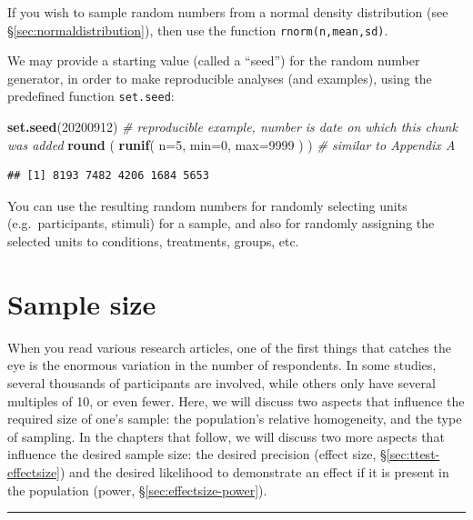 \documentclass[
]{book}
\newenvironment{Shaded}{\begin{snugshade}}{\end{snugshade}}
\newcommand{\AttributeTok}[1]{\textcolor[rgb]{0.13,0.29,0.53}{#1}}
\newcommand{\CommentTok}[1]{\textcolor[rgb]{0.56,0.35,0.01}{\textit{#1}}}
\newcommand{\DecValTok}[1]{\textcolor[rgb]{0.00,0.00,0.81}{#1}}
\newcommand{\FunctionTok}[1]{\textcolor[rgb]{0.13,0.29,0.53}{\textbf{#1}}}
\newcommand{\NormalTok}[1]{#1}
\begin{document}
If you wish to sample random numbers from a normal density distribution (see §\ref{sec:normaldistribution}), then use the function \texttt{rnorm(n,mean,sd)}.

We may provide a starting value (called a ``seed'') for the random number generator, in order to make reproducible analyses (and examples), using the predefined function \texttt{set.seed}:

\begin{Shaded}
\begin{Highlighting}[]
\FunctionTok{set.seed}\NormalTok{(}\DecValTok{20200912}\NormalTok{) }\CommentTok{\# reproducible example, number is date on which this chunk was added}
\FunctionTok{round}\NormalTok{ ( }\FunctionTok{runif}\NormalTok{( }\AttributeTok{n=}\DecValTok{5}\NormalTok{, }\AttributeTok{min=}\DecValTok{0}\NormalTok{, }\AttributeTok{max=}\DecValTok{9999}\NormalTok{ ) ) }\CommentTok{\# similar to Appendix A}
\end{Highlighting}
\end{Shaded}

\begin{verbatim}
## [1] 8193 7482 4206 1684 5653
\end{verbatim}

You can use the resulting random numbers for randomly selecting units (e.g.~participants, stimuli) for a sample, and also for randomly assigning the selected units to conditions, treatments, groups, etc.

\hypertarget{sec:sample-size}{%
\section{Sample size}\label{sec:sample-size}}

When you read various research articles, one of the first things that catches the eye is the enormous variation in the number of respondents. In some studies, several thousands of participants are involved, while others only have several multiples of 10, or even fewer. Here, we will discuss two aspects that influence the required size of one's sample: the population's relative homogeneity, and the type of sampling. In the chapters that follow, we will discuss two more aspects that influence the desired sample size: the desired precision (effect size, §\ref{sec:ttest-effectsize}) and the desired likelihood to demonstrate an effect if it is present in the population (power, §\ref{sec:effectsize-power}).

\begin{center}\rule{0.5\linewidth}{0.5pt}\end{center}
\end{document}
